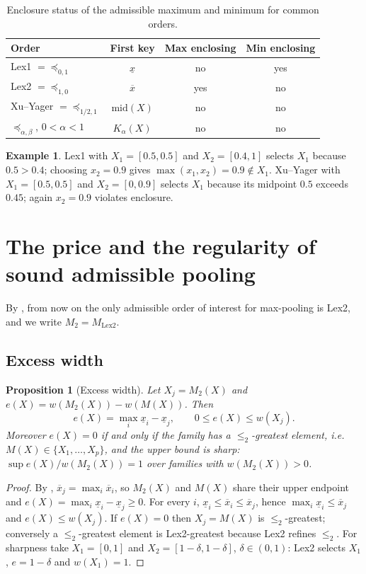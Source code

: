 \documentclass[preprint,12pt]{elsarticle}
\newtheorem{proposition}[theorem]{Proposition}
\theoremstyle{definition}
\newtheorem{example}[theorem]{Example}
\newcommand{\lo}[1]{\underline{#1}}
\newcommand{\up}[1]{\overline{#1}}
\begin{document}
\begin{table}[t]
\centering
\caption{Enclosure status of the admissible maximum and minimum for common orders.}
\label{tab:status}
\begin{tabular}{lccc}
\toprule
Order & First key & Max enclosing & Min enclosing \\
\midrule
Lex1 $=\preceq_{0,1}$ & $\lo x$ & no & yes \\
Lex2 $=\preceq_{1,0}$ & $\up x$ & yes & no \\
Xu--Yager $=\preceq_{1/2,1}$ & $\mathrm{mid}(X)$ & no & no \\
$\preceq_{\alpha,\beta}$, $0<\alpha<1$ & $K_\alpha(X)$ & no & no \\
\bottomrule
\end{tabular}
\end{table}

\begin{example}\label{ex:fail}
Lex1 with $X_1=[0.5,0.5]$ and $X_2=[0.4,1]$ selects $X_1$ because $0.5>0.4$; choosing $x_2=0.9$ gives $\max(x_1,x_2)=0.9\notin X_1$. Xu--Yager with $X_1=[0.5,0.5]$ and $X_2=[0,0.9]$ selects $X_1$ because its midpoint $0.5$ exceeds $0.45$; again $x_2=0.9$ violates enclosure.
\end{example}

\section{The price and the regularity of sound admissible pooling}
\label{sec:price}

By , from now on the only admissible order of interest for max-pooling is Lex2, and we write $M_2=M_{\mathrm{Lex2}}$.

\subsection{Excess width}

\begin{proposition}[Excess width]\label{prop:excess}
Let $X_j=M_2(X)$ and $e(X)=w(M_2(X))-w(M(X))$. Then
\[
e(X)=\max_i\lo x_i-\lo x_j,\qquad 0\le e(X)\le w(X_j).
\]
Moreover $e(X)=0$ if and only if the family has a $\le_2$-greatest element, i.e.\ $M(X)\in\{X_1,\dots,X_p\}$, and the upper bound is sharp: $\sup e(X)/w(M_2(X))=1$ over families with $w(M_2(X))>0$.
\end{proposition}

\begin{proof}
By , $\up x_j=\max_i\up x_i$, so $M_2(X)$ and $M(X)$ share their upper endpoint and $e(X)=\max_i\lo x_i-\lo x_j\ge0$. For every $i$, $\lo x_i\le\up x_i\le\up x_j$, hence $\max_i\lo x_i\le\up x_j$ and $e(X)\le w(X_j)$. If $e(X)=0$ then $X_j=M(X)$ is $\le_2$-greatest; conversely a $\le_2$-greatest element is Lex2-greatest because Lex2 refines $\le_2$. For sharpness take $X_1=[0,1]$ and $X_2=[1-\delta,1-\delta]$, $\delta\in(0,1)$: Lex2 selects $X_1$, $e=1-\delta$ and $w(X_1)=1$.
\end{proof}
\end{document}
